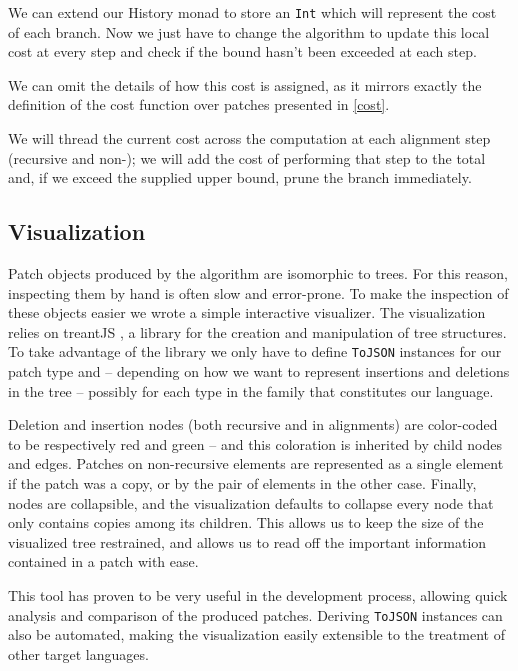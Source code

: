 \documentclass[11pt, titlepage]{article}
\newcommand{\toHaskell}[1]{\texttt{#1}\xspace}
\begin{document}
We can extend our History monad to store an \texttt{Int} which will represent the cost of each branch. Now we just have to change the algorithm to update this local cost at every step and check if the bound hasn't been exceeded at each step. 

We can omit the details of how this cost is assigned, as it mirrors exactly the definition of the cost function over patches presented in \ref{cost}. 

We will thread the current cost across the computation at each alignment step (recursive and non-); we will add the cost of performing that step to the total and, if we exceed the supplied upper bound, prune the branch immediately.

\subsection{Visualization}\label{viz}

Patch objects produced by the algorithm are isomorphic to trees. For this reason, inspecting them by hand is often slow and error-prone. To make the inspection of these objects easier we wrote a simple interactive visualizer. 
The visualization relies on treantJS \cite{treant}, a library for the creation and manipulation of tree structures. To take advantage of the library we only have to define \texttt{ToJSON} instances for our patch type and -- depending on how we want to represent insertions and deletions in the tree -- possibly for each type in the family that constitutes our language.

Deletion and insertion nodes (both recursive and in alignments) are color-coded to be respectively red and green -- and this coloration is inherited by child nodes and edges. 
Patches on non-recursive elements are represented as a single element if the patch was a copy, or by the pair of elements in the other case. 
Finally, nodes are collapsible, and the visualization defaults to collapse every node that only contains copies among its children. This allows us to keep the size of the visualized tree restrained, and allows us to read off the important information contained in a patch with ease.

This tool has proven to be very useful in the development process, allowing quick analysis and comparison of the produced patches. Deriving \toHaskell{ToJSON} instances can also be automated, making the visualization easily extensible to the treatment of other target languages.
\end{document}
